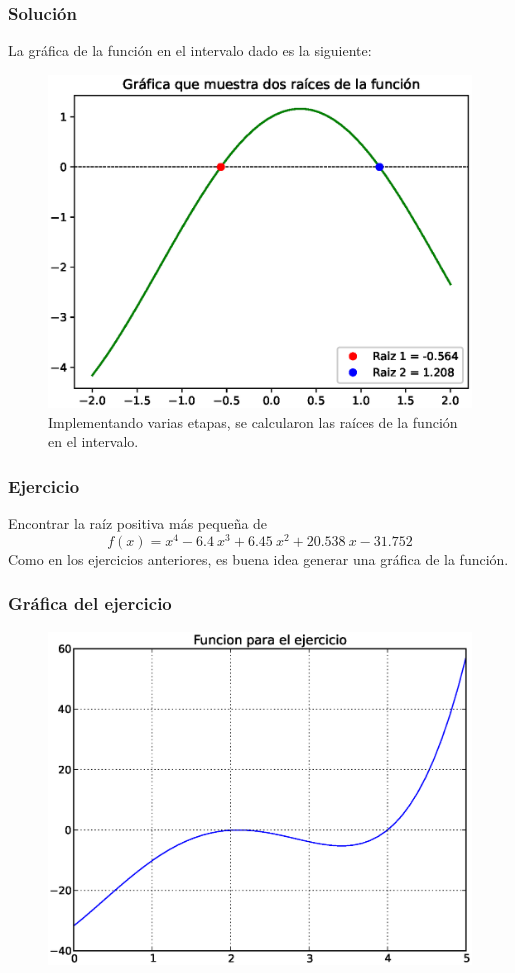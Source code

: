 \begin{frame}
\frametitle{Solución}
La gráfica de la función en el intervalo dado es la siguiente:
\begin{figure}
	\centering
	\includegraphics[scale=0.4]{Imagenes/Ejercicio_NR_Seno_02.eps}
	\caption{Implementando varias etapas, se calcularon las raíces de la función en el  intervalo.}
\end{figure}
\end{frame}
\begin{frame}
\frametitle{Ejercicio}
Encontrar la raíz positiva más pequeña de
\[ f(x) = x^{4} - 6.4 \: x^{3} + 6.45 \: x^{2} + 20.538 \: x - 31.752\]
Como en los ejercicios anteriores, es buena idea generar una gráfica de la función.
\end{frame}
\begin{frame}
\frametitle{Gráfica del ejercicio}
\begin{figure}
	\centering
	\includegraphics[scale=0.5]{Imagenes/raices08.eps}
\end{figure}
\end{frame}
